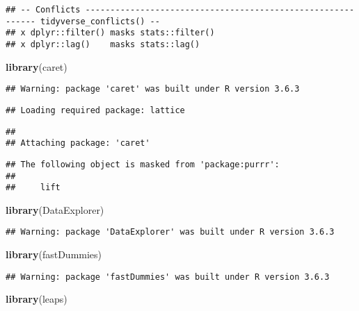 \documentclass[
]{article}
\newenvironment{Shaded}{\begin{snugshade}}{\end{snugshade}}
\newcommand{\KeywordTok}[1]{\textcolor[rgb]{0.13,0.29,0.53}{\textbf{#1}}}
\newcommand{\NormalTok}[1]{#1}
\begin{document}
\begin{verbatim}
## -- Conflicts ------------------------------------------------------------ tidyverse_conflicts() --
## x dplyr::filter() masks stats::filter()
## x dplyr::lag()    masks stats::lag()
\end{verbatim}

\begin{Shaded}
\begin{Highlighting}[]
\KeywordTok{library}\NormalTok{(caret)}
\end{Highlighting}
\end{Shaded}

\begin{verbatim}
## Warning: package 'caret' was built under R version 3.6.3
\end{verbatim}

\begin{verbatim}
## Loading required package: lattice
\end{verbatim}

\begin{verbatim}
## 
## Attaching package: 'caret'
\end{verbatim}

\begin{verbatim}
## The following object is masked from 'package:purrr':
## 
##     lift
\end{verbatim}

\begin{Shaded}
\begin{Highlighting}[]
\KeywordTok{library}\NormalTok{(DataExplorer)}
\end{Highlighting}
\end{Shaded}

\begin{verbatim}
## Warning: package 'DataExplorer' was built under R version 3.6.3
\end{verbatim}

\begin{Shaded}
\begin{Highlighting}[]
\KeywordTok{library}\NormalTok{(fastDummies)}
\end{Highlighting}
\end{Shaded}

\begin{verbatim}
## Warning: package 'fastDummies' was built under R version 3.6.3
\end{verbatim}

\begin{Shaded}
\begin{Highlighting}[]
\KeywordTok{library}\NormalTok{(leaps)}
\end{Highlighting}
\end{Shaded}
\end{document}
